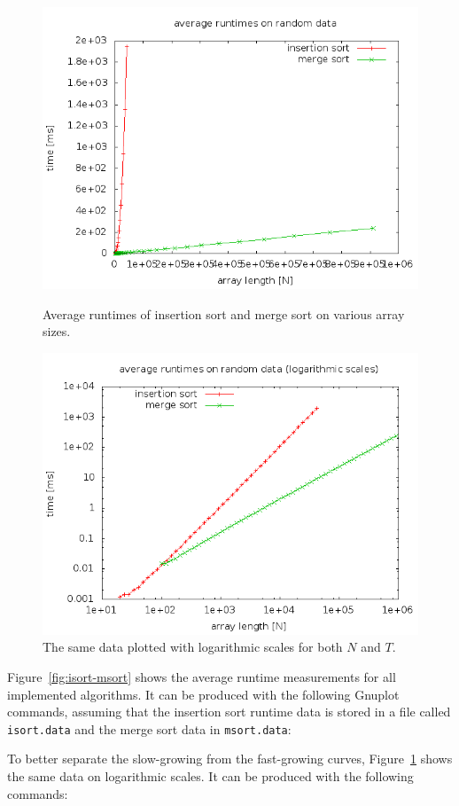 \documentclass[a4paper,10pt]{article}
\begin{document}
\begin{figure}
  \centering
  \includegraphics[width=0.7\columnwidth]{examples/isort-msort.png}
  \caption{
    Average runtimes of insertion sort and merge sort on various array sizes.
  }\label{fig:isort-msort}
  \vspace{\baselineskip}
  \includegraphics[width=0.7\columnwidth]{examples/isort-msort-logscale.png}
  \caption{
    The same data plotted with logarithmic scales for both $N$ and $T$.
  }\label{fig:isort-msort-logscale}
\end{figure}

Figure~\ref{fig:isort-msort} shows the average runtime measurements for all implemented algorithms.
It can be produced with the following Gnuplot commands, assuming that the insertion sort runtime data is stored in a file called \texttt{isort.data} and the merge sort data in \texttt{msort.data}:

\small\noindent

\normalsize

To better separate the slow-growing from the fast-growing curves, Figure~\ref{fig:isort-msort-logscale} shows the same data on logarithmic scales.
It can be produced with the following commands:
\end{document}
